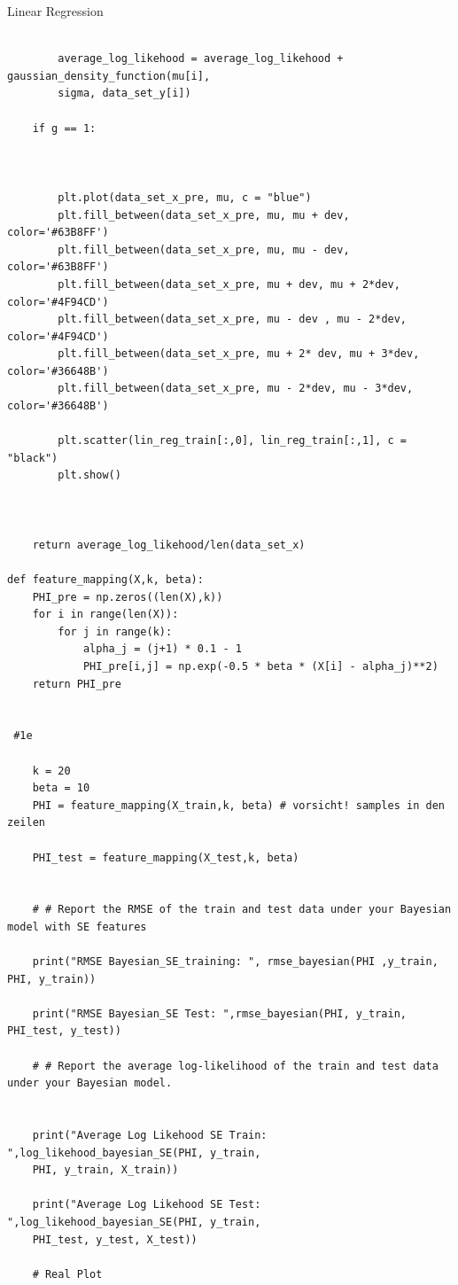 \begin{task}{Linear Regression}
\begin{subtask}
\begin{lstlisting}
        
        average_log_likehood = average_log_likehood + gaussian_density_function(mu[i], 
        sigma, data_set_y[i])
        
    if g == 1:
    
    
    
        plt.plot(data_set_x_pre, mu, c = "blue")
        plt.fill_between(data_set_x_pre, mu, mu + dev, color='#63B8FF')
        plt.fill_between(data_set_x_pre, mu, mu - dev, color='#63B8FF')
        plt.fill_between(data_set_x_pre, mu + dev, mu + 2*dev, color='#4F94CD')
        plt.fill_between(data_set_x_pre, mu - dev , mu - 2*dev, color='#4F94CD')
        plt.fill_between(data_set_x_pre, mu + 2* dev, mu + 3*dev, color='#36648B')
        plt.fill_between(data_set_x_pre, mu - 2*dev, mu - 3*dev, color='#36648B')
        
        plt.scatter(lin_reg_train[:,0], lin_reg_train[:,1], c = "black")
        plt.show()
    
    
        
    return average_log_likehood/len(data_set_x)

def feature_mapping(X,k, beta):
    PHI_pre = np.zeros((len(X),k))
    for i in range(len(X)):
        for j in range(k):
            alpha_j = (j+1) * 0.1 - 1
            PHI_pre[i,j] = np.exp(-0.5 * beta * (X[i] - alpha_j)**2)
    return PHI_pre
    
    
 #1e
    
    k = 20
    beta = 10
    PHI = feature_mapping(X_train,k, beta) # vorsicht! samples in den zeilen

    PHI_test = feature_mapping(X_test,k, beta)

    
    # # Report the RMSE of the train and test data under your Bayesian model with SE features
    
    print("RMSE Bayesian_SE_training: ", rmse_bayesian(PHI ,y_train, PHI, y_train))
    
    print("RMSE Bayesian_SE Test: ",rmse_bayesian(PHI, y_train, PHI_test, y_test))
    
    # # Report the average log-likelihood of the train and test data under your Bayesian model.
    
    
    print("Average Log Likehood SE Train: ",log_likehood_bayesian_SE(PHI, y_train, 
    PHI, y_train, X_train))
    
    print("Average Log Likehood SE Test: ",log_likehood_bayesian_SE(PHI, y_train, 
    PHI_test, y_test, X_test))
    
    # Real Plot
    

\end{lstlisting}
\end{subtask}
\end{task}
